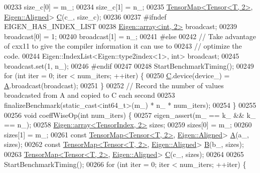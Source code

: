 \begin{DoxyCode}
00233     size\_c[0] = m\_;
00234     size\_c[1] = n\_;
00235     \hyperlink{class_eigen_1_1_tensor_map}{TensorMap<Tensor<T, 2>}, \hyperlink{group__enums_gga45fe06e29902b7a2773de05ba27b47a1ad37d4c71425bb286e9b4103830538fbf}{Eigen::Aligned}> 
      \hyperlink{group___core___module}{C}(c\_, size\_c);
00236 
00237 \textcolor{preprocessor}{#ifndef EIGEN\_HAS\_INDEX\_LIST}
00238     \hyperlink{class_eigen_1_1array}{Eigen::array<int, 2>} broadcast;
00239     broadcast[0] = 1;
00240     broadcast[1] = n\_;
00241 \textcolor{preprocessor}{#else}
00242     \textcolor{comment}{// Take advantage of cxx11 to give the compiler information it can use to}
00243     \textcolor{comment}{// optimize the code.}
00244     Eigen::IndexList<Eigen::type2index<1>, \textcolor{keywordtype}{int}> broadcast;
00245     broadcast.set(1, n\_);
00246 \textcolor{preprocessor}{#endif}
00247 
00248     StartBenchmarkTiming();
00249     \textcolor{keywordflow}{for} (\textcolor{keywordtype}{int} iter = 0; iter < num\_iters; ++iter) \{
00250       \hyperlink{group___core___module}{C}.device(device\_) = \hyperlink{group___core___module_class_eigen_1_1_matrix}{A}.broadcast(broadcast);
00251     \}
00252     \textcolor{comment}{// Record the number of values broadcasted from A and copied to C each second}
00253     finalizeBenchmark(static\_cast<int64\_t>(m\_) * n\_ * num\_iters);
00254   \}
00255 
00256   \textcolor{keywordtype}{void} coeffWiseOp(\textcolor{keywordtype}{int} num\_iters) \{
00257     eigen\_assert(m\_ == k\_ && k\_ == n\_);
00258     \hyperlink{class_eigen_1_1array}{Eigen::array<TensorIndex, 2>} sizes;
00259     sizes[0] = m\_;
00260     sizes[1] = m\_;
00261     \textcolor{keyword}{const} \hyperlink{class_eigen_1_1_tensor_map}{TensorMap<Tensor<T, 2>}, \hyperlink{group__enums_gga45fe06e29902b7a2773de05ba27b47a1ad37d4c71425bb286e9b4103830538fbf}{Eigen::Aligned}> 
      \hyperlink{group___core___module_class_eigen_1_1_matrix}{A}(a\_, sizes);
00262     \textcolor{keyword}{const} \hyperlink{class_eigen_1_1_tensor_map}{TensorMap<Tensor<T, 2>}, \hyperlink{group__enums_gga45fe06e29902b7a2773de05ba27b47a1ad37d4c71425bb286e9b4103830538fbf}{Eigen::Aligned}> 
      \hyperlink{group___core___module_class_eigen_1_1_matrix}{B}(b\_, sizes);
00263     \hyperlink{class_eigen_1_1_tensor_map}{TensorMap<Tensor<T, 2>}, \hyperlink{group__enums_gga45fe06e29902b7a2773de05ba27b47a1ad37d4c71425bb286e9b4103830538fbf}{Eigen::Aligned}> 
      \hyperlink{group___core___module}{C}(c\_, sizes);
00264 
00265     StartBenchmarkTiming();
00266     \textcolor{keywordflow}{for} (\textcolor{keywordtype}{int} iter = 0; iter < num\_iters; ++iter) \{

\end{DoxyCode}
